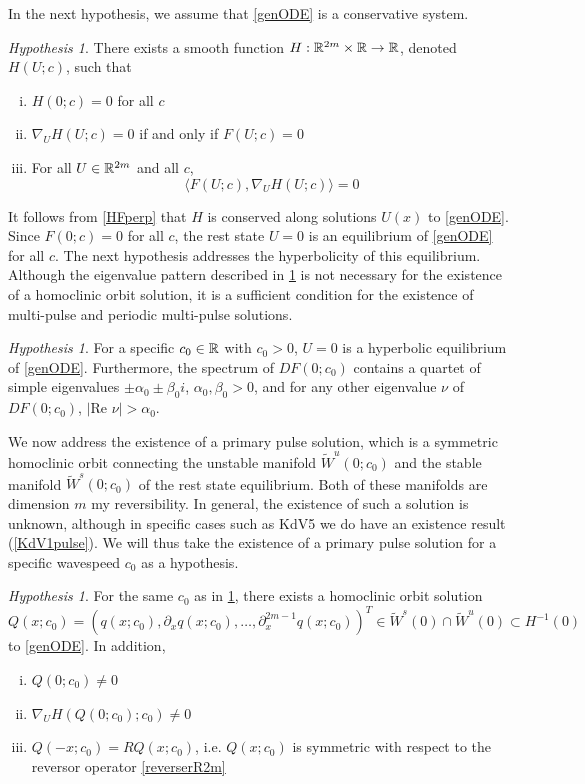 \documentclass[10pt,reqno]{amsart}
\theoremstyle{plain}
\theoremstyle{definition}
\theoremstyle{remark}
\newtheorem{hypothesis}[theorem]{Hypothesis}
\numberwithin{theorem}{section}
\numberwithin{equation}{section}
\begin{document}
In the next hypothesis, we assume that \cref{genODE} is a conservative system.
\begin{hypothesis}\label{hyp:H}
There exists a smooth function $H: \mathbb{R}^{2m} \times \mathbb{R} \rightarrow \mathbb{R}$, denoted $H(U; c)$, such that 
\begin{enumerate}[(i)]
\item $H(0; c) = 0$ for all $c$
\item $\nabla_U H(U; c) = 0$ if and only if $F(U; c) = 0$
\item For all $U \in \mathbb{R}^{2m}$ and all $c$,
\begin{equation}\label{HFperp}
\langle F(U; c), \nabla_U H(U; c) \rangle = 0
\end{equation}
\end{enumerate}
\end{hypothesis}

\noi It follows from \cref{HFperp} that $H$ is conserved along solutions $U(x)$ to \cref{genODE}. Since $F(0; c) = 0$ for all $c$, the rest state $U = 0$ is an equilibrium of \cref{genODE} for all $c$. The next hypothesis addresses the hyperbolicity of this equilibrium. Although the eigenvalue pattern described in \cref{hyp:hypeq} is not necessary for the existence of a homoclinic orbit solution, it is a sufficient condition for the existence of multi-pulse and periodic multi-pulse solutions.

\begin{hypothesis}\label{hyp:hypeq}
For a specific $c_0 \in \mathbb{R}$ with $c_0 > 0$, $U = 0$ is a hyperbolic equilibrium of \cref{genODE}. Furthermore, the spectrum of $DF(0; c_0)$ contains a quartet of simple eigenvalues $\pm \alpha_0 \pm \beta_0 i$, $\alpha_0, \beta_0 > 0$, and for any other eigenvalue $\nu$ of $DF(0; c_0)$, $|\text{Re }\nu| > \alpha_0$.
\end{hypothesis}

We now address the existence of a primary pulse solution, which is a symmetric homoclinic orbit connecting the unstable manifold $\tilde{W}^u(0; c_0)$ and the stable manifold $\tilde{W}^s(0; c_0)$ of the rest state equilibrium. Both of these manifolds are dimension $m$ my reversibility. In general, the existence of such a solution is unknown, although in specific cases such as KdV5 we do have an existence result (\cref{KdV1pulse}). We will thus take the existence of a primary pulse solution for a specific wavespeed $c_0$ as a hypothesis.

\begin{hypothesis}\label{Qexistshyp}
For the same $c_0$ as in \cref{hyp:hypeq}, there exists a homoclinic orbit solution $Q(x; c_0) = (q(x; c_0), \partial_x q(x; c_0), \dots, \partial_x^{2m-1}q(x; c_0))^T\in \tilde{W}^s(0) \cap \tilde{W}^u(0) \subset H^{-1}(0)$ to \cref{genODE}. In addition,
\begin{enumerate}[(i)]
\item $Q(0; c_0) \neq 0$
\item $\nabla_U H(Q(0; c_0); c_0) \neq 0$
\item $Q(-x; c_0) = R Q(x; c_0)$, i.e. $Q(x; c_0)$ is symmetric with respect to the reversor operator \cref{reverserR2m}
\end{enumerate}
\end{hypothesis}
\end{document}
